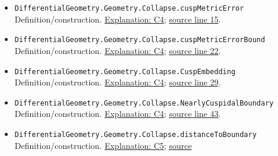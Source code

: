 \documentclass[
  letterpaper,
  11pt]{article}
\begin{document}
\begin{itemize}
\item
  {\small\texttt{Differential\allowbreak{}Geometry.\allowbreak{}Geometry.\allowbreak{}Collapse.\allowbreak{}cusp\allowbreak{}Metric\allowbreak{}Error}}\\
  Definition/construction.
  \hyperref[collapse-cuspembedding]{Explanation: C4};
  \href{https://github.com/qinz1yang/differential-geometry-dev/blob/ea0fae60ee01ef8c8d9b57a51794c6538f679c5d/DifferentialGeometry/Geometry/Collapse/CuspBoundary.lean\#L15}{source
  line 15}.
\item
  {\small\texttt{Differential\allowbreak{}Geometry.\allowbreak{}Geometry.\allowbreak{}Collapse.\allowbreak{}cusp\allowbreak{}Metric\allowbreak{}Error\allowbreak{}Bound}}\\
  Definition/construction.
  \hyperref[collapse-cuspembedding]{Explanation: C4};
  \href{https://github.com/qinz1yang/differential-geometry-dev/blob/ea0fae60ee01ef8c8d9b57a51794c6538f679c5d/DifferentialGeometry/Geometry/Collapse/CuspBoundary.lean\#L22}{source
  line 22}.
\item
  {\small\texttt{Differential\allowbreak{}Geometry.\allowbreak{}Geometry.\allowbreak{}Collapse.\allowbreak{}Cusp\allowbreak{}Embedding}}\\
  Definition/construction.
  \hyperref[collapse-cuspembedding]{Explanation: C4};
  \href{https://github.com/qinz1yang/differential-geometry-dev/blob/ea0fae60ee01ef8c8d9b57a51794c6538f679c5d/DifferentialGeometry/Geometry/Collapse/CuspBoundary.lean\#L29}{source
  line 29}.
\item
  {\small\texttt{Differential\allowbreak{}Geometry.\allowbreak{}Geometry.\allowbreak{}Collapse.\allowbreak{}Nearly\allowbreak{}Cuspidal\allowbreak{}Boundary}}\\
  Definition/construction.
  \hyperref[collapse-cuspembedding]{Explanation: C4};
  \href{https://github.com/qinz1yang/differential-geometry-dev/blob/ea0fae60ee01ef8c8d9b57a51794c6538f679c5d/DifferentialGeometry/Geometry/Collapse/CuspBoundary.lean\#L43}{source
  line 43}.
\item
  {\small\texttt{Differential\allowbreak{}Geometry.\allowbreak{}Geometry.\allowbreak{}Collapse.\allowbreak{}distance\allowbreak{}To\allowbreak{}Boundary}}\\
  Definition/construction.
  \hyperref[collapse-boundarydistance]{Explanation: C5};
  \href{https://github.com/qinz1yang/differential-geometry-dev/blob/ea0fae60ee01ef8c8d9b57a51794c6538f679c5d/DifferentialGeometry/Geometry/Collapse/CuspBoundary.lean\#L56}{source
}
\end{itemize}
\end{document}
